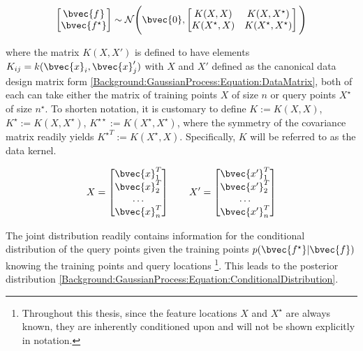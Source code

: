 			\begin{equation}
				\begin{bmatrix}
					\bvec{f^{ }} \\ \bvec{f^{\star}}
				\end{bmatrix}
				\sim \mathcal{N}\Bigg(\bvec{0}, \begin{bmatrix}
													K(X, X) & K(X, X^{\star}) \\
													K(X^{\star}, X) & K(X^{\star}, X^{\star}) \\
												\end{bmatrix}  \Bigg)
			\label{Background:GaussianProcess:Equation:Distribution}
			\end{equation}
			
			where the matrix $K(X, X')$ is defined to have elements $K_{ij} = k(\bvec{x}_{i}, \bvec{x}'_{j})$ with $X$ and $X'$ defined as the canonical data design matrix form \eqref{Background:GaussianProcess:Equation:DataMatrix}, both of each can take either the matrix of training points $X$ of size $n$ or query points $X^{\star}$ of size $n^{\star}$. To shorten notation, it is customary to define $K := K(X, X)$, $K^{\star} := K(X, X^{\star})$, $K^{\star \star} := K(X^{\star}, X^{\star})$, where the symmetry of the covariance matrix readily yields ${K^{\star}}^{T} := K(X^{\star}, X)$. Specifically, $K$ will be referred to as the data kernel.
			
			\begin{equation}
				X = \begin{bmatrix}
					\bvec{x}_{1}^{T} \\ \bvec{x}_{2}^{T} \\ \dots \\ \bvec{x}_{n}^{T}
				\end{bmatrix} \qquad X' = \begin{bmatrix}
									\bvec{x'}_{1}^{T} \\ \bvec{x'}_{2}^{T} \\ \dots \\ \bvec{x'}_{n}^{T}
								\end{bmatrix}
			\label{Background:GaussianProcess:Equation:DataMatrix}
			\end{equation}	
				
			The joint distribution readily contains information for the conditional distribution of the query points given the training points $p(\bvec{f^{\star}} | \bvec{f})$ knowing the training points and query locations \footnote{Throughout this thesis, since the feature locations $X$ and $X^{\star}$ are always known, they are inherently conditioned upon and will not be shown explicitly in notation.}. This leads to the posterior distribution \eqref{Background:GaussianProcess:Equation:ConditionalDistribution}.
			
